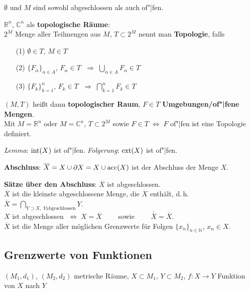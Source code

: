 $\emptyset$ und $M$ sind sowohl abgeschlossen als auch of"|fen.

\linie

$\mathbb{R}^n$, $\mathbb{C}^n$ als \textbf{topologische Räume}: \\
$2^M$ Menge aller Teilmengen aus $M$, $T \subset 2^M$ nennt man
\textbf{Topologie}, falls

\begin{itemize}
    \item[(1)] $\emptyset \in T$, $M \in T$

    \item[(2)] $\{F_\alpha\}_{\alpha \in A}$, $F_\alpha \in T$
    $\;\Rightarrow\; \bigcup_{\alpha \in A} F_\alpha \in T$

    \item[(3)] $\{F_k\}_{k=1}^n$, $F_k \in T$
    $\;\Rightarrow\; \bigcap_{k=1}^n F_k \in T$
\end{itemize}

$(M,T)$ heißt dann \textbf{topologischer Raum}, $F \in T$
\textbf{Umgebungen/of"|fene Mengen}. \\
Mit $M = \mathbb{R}^n$ oder $M = \mathbb{C}^n$, $T \subset 2^M$ sowie
$F \in T \;\Leftrightarrow\; F$ of"|fen ist eine Topologie definiert.

\emph{Lemma}: $\operatorname{int}(X)$ ist of"|fen. \qquad
\emph{Folgerung}: $\operatorname{ext}(X)$ ist of"|fen.

\linie

\textbf{Abschluss}: $\overline{X} = X \cup \partial X = X \cup \operatorname{acc}(X)$ ist
der Abschluss der Menge $X$.

\textbf{Sätze über den Abschluss}:
$\overline{X}$ ist abgeschlossen. \\
$\overline{X}$ ist die kleinste abgeschlossene Menge, die $X$
enthält, d.\,h.
$\overline{X} = \bigcap_{Y \supset X,\; Y \text{abgeschlossen}} Y$. \\
$X$ ist abgeschlossen $\;\Leftrightarrow\; X = \overline{X} \qquad$ sowie
$\qquad \overline{\overline{X}} = \overline{X}$. \\
$\overline{X}$ ist die Menge aller möglichen Grenzwerte für Folgen
$\{x_n\}_{n \in \mathbb{N}}$, $x_n \in X$.

\subsection{%
    Grenzwerte von Funktionen%
}

$(M_1,d_1)$, $(M_2,d_2)$ metrische Räume, $X \subset M_1$, $Y \subset M_2$,
$f: X \rightarrow Y$ Funktion von $X$ nach $Y$


